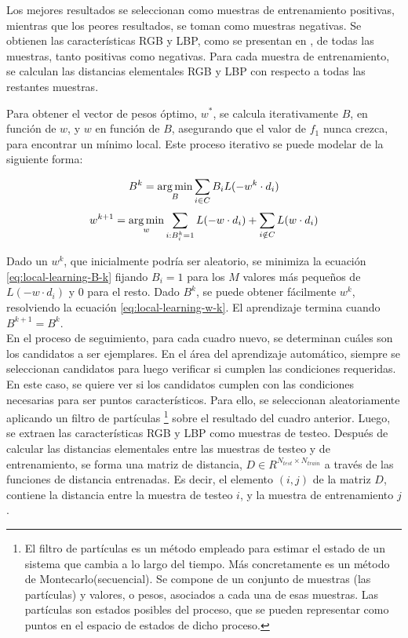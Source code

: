 Los mejores resultados se seleccionan como muestras de entrenamiento positivas, mientras que
los peores resultados, se toman como muestras negativas. Se obtienen las características
RGB y LBP, como se presentan en \cite{tracking-bag-of-features}, de todas las muestras,
tanto positivas como negativas. Para cada muestra de entrenamiento, se calculan las
distancias elementales RGB y LBP con respecto a todas las restantes muestras.

Para obtener el vector de pesos óptimo, $w^{*}$, se calcula iterativamente $B$,
en función de $w$, y $w$ en función de $B$, asegurando que el valor de $f_{1}$ nunca
crezca, para encontrar un mínimo local. Este proceso iterativo se puede modelar de la
siguiente forma:

\begin{equation}
   \label{eq:local-learning-B-k}
   B^{k} = \operatorname*{arg\,min}_{B} \sum_{i \in C} B_{i}L(-w^{k} \cdot d_{i})
\end{equation}
\begin{equation}
    \label{eq:local-learning-w-k}
    w^{k+1} = \operatorname*{arg\,min}_{w} \sum_{i:B_{i}^{k}=1} L(-w \cdot d_{i}) + \sum_{i\notin C}L(w \cdot d_{i})
\end{equation}

Dado un $w^{k}$, que inicialmente podría ser aleatorio, se minimiza la ecuación
\ref{eq:local-learning-B-k} fijando $B_{i} = 1$ para los $M$ valores más
pequeños de $L(-w \cdot d_{i})$ y $0$ para el resto. Dado $B^{k}$, se puede
obtener fácilmente $w^{k}$, resolviendo la ecuación \ref{eq:local-learning-w-k}.
El aprendizaje termina cuando $B^{k+1}=B^{k}$.\\

En el proceso de seguimiento, para cada cuadro nuevo, se determinan cuáles son los candidatos
a ser ejemplares. En el área del aprendizaje automático, siempre se seleccionan
candidatos para luego verificar si cumplen las condiciones requeridas. En este
caso, se quiere ver si los candidatos cumplen con las condiciones necesarias
para ser puntos característicos. Para ello, se seleccionan
aleatoriamente aplicando un filtro de partículas
\footnote{El filtro de partículas es un método empleado para estimar el estado
  de un sistema que cambia a lo largo del tiempo. Más concretamente es un
  método de Montecarlo(secuencial). Se compone de un conjunto de muestras (las
  partículas) y valores, o pesos, asociados a cada una de esas muestras.
  Las partículas son estados posibles del proceso, que se pueden representar
  como puntos en el espacio de estados de dicho proceso.}
sobre el resultado del cuadro anterior. Luego, se extraen las características
RGB y LBP como muestras de testeo. Después de calcular las distancias
elementales entre las muestras de testeo y de entrenamiento, se forma una
matriz de distancia, $D \in R^{N_{test} \times N_{train}}$ a través de las
funciones de distancia entrenadas. Es decir, el elemento $(i,j)$ de la matriz
$D$, contiene la distancia entre la muestra de testeo $i$, y la muestra de
entrenamiento $j$.

